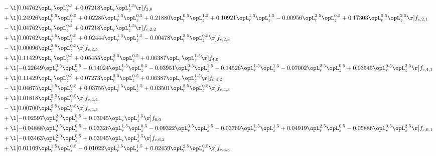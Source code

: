 \begin{alignat}{2}
& - \l[  0.04762 \opL_r \opL_z^{0.5} +  0.07218 \opL_r \opL_z^{1.5}  \r] f_{2,0} \nonumber \\ 
& + \l[  0.24926 \opL_r^{0.5} \opL_z^{0.5} +  0.02285 \opL_r^{1.5} \opL_z^{0.5} +  0.21880 \opL_r^{0.5} \opL_z^{1.5} +  0.10921 \opL_r^{1.5} \opL_z^{1.5}   -0.00956 \opL_r^{2.5} \opL_z^{0.5} +  0.17303 \opL_r^{0.5} \opL_z^{2.5}  \r] f_{c,2,1} \nonumber \\ 
& - \l[  0.04762 \opL_r \opL_z^{0.5} +  0.07218 \opL_r \opL_z^{1.5}  \r] f_{c,2,2} \nonumber \\ 
& + \l[  0.00762 \opL_r^{1.5} \opL_z^{0.5} +  0.02444 \opL_r^{1.5} \opL_z^{1.5}   -0.00478 \opL_r^{2.5} \opL_z^{0.5}  \r] f_{c,2,3} \nonumber \\ 
& - \l[  0.00096 \opL_r^{2.5} \opL_z^{0.5}  \r] f_{c,2,5} \nonumber \\ 
& + \l[  0.11429 \opL_r \opL_z^{0.5} +  0.05455 \opL_r^{2.0} \opL_z^{0.5} +  0.06387 \opL_r \opL_z^{1.5}  \r] f_{4,0} \nonumber \\ 
& + \l[  -0.22649 \opL_r^{0.5} \opL_z^{0.5}   -0.14024 \opL_r^{1.5} \opL_z^{0.5}   -0.03951 \opL_r^{0.5} \opL_z^{1.5}   -0.14526 \opL_r^{1.5} \opL_z^{1.5}   -0.07002 \opL_r^{2.5} \opL_z^{0.5} +  0.03545 \opL_r^{0.5} \opL_z^{2.5}  \r] f_{c,4,1} \nonumber \\ 
& + \l[  0.11429 \opL_r \opL_z^{0.5} +  0.07273 \opL_r^{2.0} \opL_z^{0.5} +  0.06387 \opL_r \opL_z^{1.5}  \r] f_{c,4,2} \nonumber \\ 
& - \l[  0.04675 \opL_r^{1.5} \opL_z^{0.5} +  0.03755 \opL_r^{1.5} \opL_z^{1.5} +  0.03501 \opL_r^{2.5} \opL_z^{0.5}  \r] f_{c,4,3} \nonumber \\ 
& + \l[  0.01818 \opL_r^{2.0} \opL_z^{0.5}  \r] f_{c,4,4} \nonumber \\ 
& - \l[  0.00700 \opL_r^{2.5} \opL_z^{0.5}  \r] f_{c,4,5} \nonumber \\ 
& + \l[  -0.02597 \opL_r^{2.0} \opL_z^{0.5} +  0.03945 \opL_r \opL_z^{1.5}  \r] f_{6,0} \nonumber \\ 
& + \l[  -0.04888 \opL_r^{0.5} \opL_z^{0.5} +  0.03326 \opL_r^{1.5} \opL_z^{0.5}   -0.09322 \opL_r^{0.5} \opL_z^{1.5}   -0.03769 \opL_r^{1.5} \opL_z^{1.5} +  0.04919 \opL_r^{2.5} \opL_z^{0.5}   -0.05886 \opL_r^{0.5} \opL_z^{2.5}  \r] f_{c,6,1} \nonumber \\ 
& + \l[  -0.03463 \opL_r^{2.0} \opL_z^{0.5} +  0.03945 \opL_r \opL_z^{1.5}  \r] f_{c,6,2} \nonumber \\ 
& + \l[  0.01109 \opL_r^{1.5} \opL_z^{0.5}   -0.01022 \opL_r^{1.5} \opL_z^{1.5} +  0.02459 \opL_r^{2.5} \opL_z^{0.5}  \r] f_{c,6,3} \nonumber \\ 

\end{alignat}
